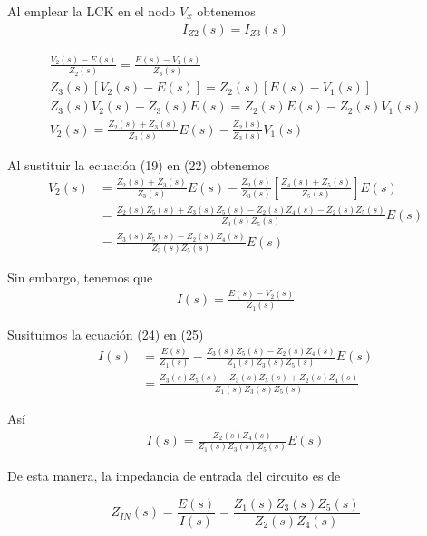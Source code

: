 \documentclass[12pt]{article}
\begin{document}
\noindent Al emplear la LCK en el nodo $V_x$ obtenemos 
\begin{align}
	I_{Z2}(s) = I_{Z3}(s)
\end{align}

\begin{align}
	\frac{ V_2(s) - E(s) }{Z_2(s)} = \frac{E(s) - V_1(s)}{Z_3(s)}\\
	Z_3(s) \left[ V_2(s) - E(s) \right] = Z_2(s) \left[ E(s) - V_1(s) \right]\nonumber\\
	Z_3(s)V_2(s) - Z_3(s)E(s) =  Z_2(s)E(s) - Z_2(s)V_1(s) \nonumber\\
	V_2(s) = \frac{ Z_2(s) + Z_3(s) }{Z_3(s)}E(s) - \frac{Z_2(s)}{Z_3(s)}V_1(s)
\end{align}


\noindent Al sustituir la ecuación (19) en (22) obtenemos
\begin{align}
	V_2(s) &= \frac{ Z_2(s) + Z_3(s) }{Z_3(s)}E(s) - \frac{Z_2(s)}{Z_3(s)}\left[ \frac{Z_4(s) + Z_5(s)}{Z_5(s)} \right]E(s)\\
	&= \frac{ Z_2(s)Z_5(s) + Z_3(s)Z_5(s) - Z_2(s)Z_4(s) - Z_2(s)Z_5(s) }{ Z_3(s)Z_5(s) }E(s)\nonumber\\
	&= \frac{ Z_3(s)Z_5(s) - Z_2(s)Z_4(s)}{ Z_3(s)Z_5(s) }E(s)
\end{align}

\noindent Sin embargo, tenemos que
\begin{align}
	I(s) = \frac{E(s) - V_2(s)}{Z_1(s)}
\end{align}

\noindent Susituimos la ecuación (24) en (25)
\begin{align}
	I(s) &= \frac{E(s)}{Z_1(s)} - \frac{ Z_3(s)Z_5(s) - Z_2(s)Z_4(s)}{ Z_1(s)Z_3(s)Z_5(s) }E(s)\\
	&= \frac{ Z_3(s)Z_5(s) - Z_3(s)Z_5(s) + Z_2(s)Z_4(s) }{ Z_1(s)Z_3(s)Z_5(s) }
\end{align}

\noindent Así
\begin{align}
	I(s) = \frac{Z_2(s)Z_4(s)}{ Z_1(s)Z_3(s)Z_5(s) }E(s)
\end{align}

\noindent De esta manera, la impedancia de entrada del circuito es de
\begin{tcolorbox}[colback=red!5!white,colframe=red!75!black,arc=0mm,boxrule=0mm,width=(\linewidth+0.5cm)]
	\begin{equation}
		Z_{IN}(s) = \frac{E(s)}{I(s)} = \frac{ Z_1(s)Z_3(s)Z_5(s) }{ Z_2(s)Z_4(s) }
	\end{equation}
\end{tcolorbox}
\end{document}
